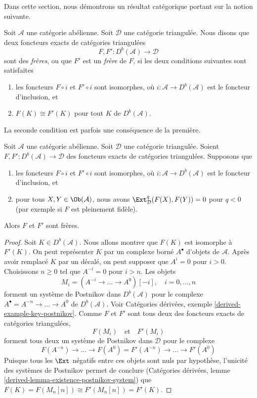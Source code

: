 \noindent
Dans cette section, nous démontrons un résultat catégorique portant sur la notion suivante.

\begin{definition}
\label{definition-siblings}
Soit $\mathcal{A}$ une catégorie abélienne. Soit $\mathcal{D}$ une
catégorie triangulée. Nous disons que deux foncteurs exacts de catégories triangulées
$$
F, F' : D^b(\mathcal{A}) \longrightarrow \mathcal{D}
$$
sont des {\it frères}, ou que $F'$ est un {\it frère} de $F$,
si les deux conditions suivantes sont satisfaites
\begin{enumerate}
\item les foncteurs $F \circ i$ et $F' \circ i$ sont isomorphes,
où $i : \mathcal{A} \to D^b(\mathcal{A})$ est le foncteur d'inclusion, et
\item $F(K) \cong F'(K)$ pour tout $K$ de $D^b(\mathcal{A})$.
\end{enumerate}
\end{definition}

\noindent
La seconde condition est parfois une conséquence de la première.

\begin{lemma}
\label{lemma-sibling-fully-faithful}
Soit $\mathcal{A}$ une catégorie abélienne. Soit $\mathcal{D}$ une
catégorie triangulée. Soient
$F, F' : D^b(\mathcal{A}) \longrightarrow \mathcal{D}$
des foncteurs exacts de catégories triangulées. Supposons que
\begin{enumerate}
\item les foncteurs $F \circ i$ et $F' \circ i$ sont isomorphes,
où $i : \mathcal{A} \to D^b(\mathcal{A})$ est le foncteur d'inclusion, et
\item pour tous $X, Y \in \Ob(\mathcal{A})$, nous avons
$\Ext^q_\mathcal{D}(F(X), F(Y)) = 0$ pour $q < 0$ (par exemple
si $F$ est pleinement fidèle).
\end{enumerate}
Alors $F$ et $F'$ sont frères.
\end{lemma}

\begin{proof}
Soit $K \in D^b(\mathcal{A})$. Nous allons montrer que $F(K)$ est isomorphe à $F'(K)$.
On peut représenter $K$ par un complexe borné $A^\bullet$ d'objets de
$\mathcal{A}$. Après avoir remplacé $K$ par un décalé, on peut
supposer que $A^i = 0$ pour $i > 0$. Choisissons $n \geq 0$ tel que $A^{-i} = 0$
pour $i > n$. Les objets
$$
M_i = (A^{-i} \to \ldots \to A^0)[-i],\quad i = 0, \ldots, n
$$
forment un système de Postnikov dans $D^b(\mathcal{A})$ pour le complexe
$A^\bullet = A^{-n} \to \ldots \to A^0$ de $D^b(\mathcal{A})$.
Voir Catégories dérivées, exemple \ref{derived-example-key-postnikov}.
Comme $F$ et $F'$ sont tous deux des foncteurs exacts de catégories triangulées,
$$
F(M_i)
\quad\text{et}\quad
F'(M_i)
$$
forment tous deux un système de Postnikov dans $\mathcal{D}$ pour le complexe
$$
F(A^{-n}) \to \ldots \to F(A^0) =
F'(A^{-n}) \to \ldots \to F'(A^0)
$$
Puisque tous les $\Ext$ négatifs entre ces objets sont nuls par hypothèse,
l'unicité des systèmes de Postnikov permet de conclure
(Catégories dérivées, lemme \ref{derived-lemma-existence-postnikov-system})
que $F(K) = F(M_n[n]) \cong F'(M_n[n]) = F'(K)$.
\end{proof}

